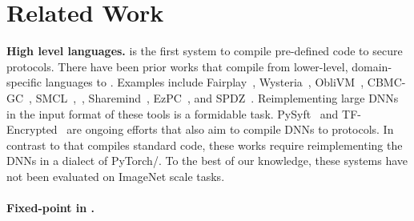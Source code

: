 \section{Related Work}\label{sec:related}

\noindent\textbf{High level languages.} \tool is the first system to compile pre-defined \tensorflow code to secure \mpc protocols. There have been prior works that compile from lower-level, domain-specific languages to \mpc. Examples include Fairplay~\cite{fairplay}, Wysteria~\cite{wysteria}, ObliVM~\cite{oblivm}, CBMC-GC~\cite{cbmcgc}, SMCL~\cite{smcl},~\cite{lambdaps}, Sharemind~\cite{sharemind}, EzPC~\cite{ezpc}, and SPDZ~\cite{spdzcompiler}. Reimplementing large DNNs in the input format of these tools is a formidable task. PySyft~\cite{pysyft} and TF-Encrypted~\cite{tfe} are ongoing efforts that also aim to compile DNNs to \mpc protocols. 
In contrast to \tool that compiles standard \tensorflow code, these works require reimplementing the DNNs in a dialect of PyTorch/\tensorflow.
To the best of our knowledge, these systems have not been evaluated on ImageNet scale tasks.
\\\\
\noindent\textbf{Fixed-point in \mpc.}
